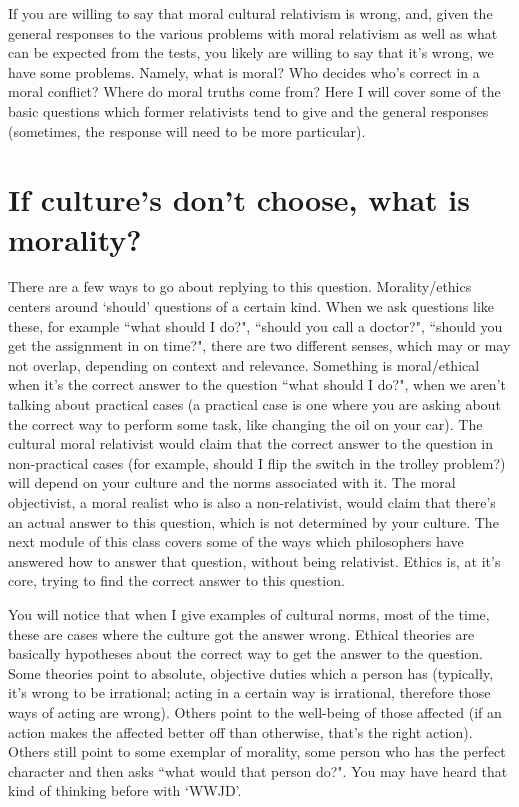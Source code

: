 If you are willing to say that moral cultural relativism is wrong, and, given the general responses to the various problems with moral relativism as well as what can be expected from the tests, you likely are willing to say that it's wrong, we have some problems. Namely, what is moral? Who decides who's correct in a moral conflict? Where do moral truths come from? Here I will cover some of the basic questions which former relativists tend to give and the general responses (sometimes, the response will need to be more particular).

\section{If culture's don't choose, what is morality?}

There are a few ways to go about replying to this question. Morality/ethics centers around `should' questions of a certain kind. When we ask questions like these, for example ``what should I do?", ``should you call a doctor?", ``should you get the assignment in on time?",  there are two different senses, which may or may not overlap, depending on context and relevance. Something is moral/ethical when it's the correct answer to the question ``what should I do?", when we aren't talking about practical cases (a practical case is one where you are asking about the correct way to perform some task, like changing the oil on your car). The cultural moral relativist would claim that the correct answer to the question in non-practical cases (for example, should I flip the switch in the trolley problem?) will depend on your culture and the norms associated with it. The moral objectivist, a moral realist who is also a non-relativist, would claim that there's an actual answer to this question, which is not determined by your culture. The next module of this class covers some of the ways which philosophers have answered how to answer that question, without being relativist. Ethics is, at it's core, trying to find the correct answer to this question.

You will notice that when I give examples of cultural norms, most of the time, these are cases where the culture got the answer wrong. Ethical theories are basically hypotheses about the correct way to get the answer to the question. Some theories point to absolute, objective duties which a person has (typically, it's wrong to be irrational; acting in a certain way is irrational, therefore those ways of acting are wrong). Others point to the well-being of those affected (if an action makes the affected better off than otherwise, that's the right action). Others still point to some exemplar of morality, some person who has the perfect character and then asks ``what would that person do?". You may have heard that kind of thinking before with `WWJD'.  

